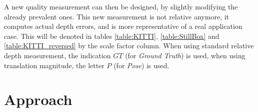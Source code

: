 \documentclass[runningheads]{llncs}
\begin{document}
A new quality measurement can then be designed, by slightly modifying the already prevalent ones. This new measurement is not relative anymore, it computes actual depth errors, and is more representative of a real application case. This will be denoted in tables \ref{table:KITTI}, \ref{table:StillBox} and \ref{table:KITTI_reversed} by the scale factor column. When using standard relative depth measurement, the indication $GT$ (for \emph{Ground Truth}) is used, when using translation magnitude, the letter $P$ (for \emph{Pose}) is used.

\section{Approach}
\end{document}

